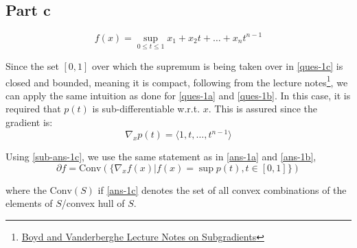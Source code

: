 \documentclass[11pt]{article}
\begin{document}
\subsection*{Part c}
\begin{flushleft}
\begin{equation}
\label{ques-1c}
\displaystyle f(x) = \sup_{0 \leq t \leq 1} x_{1} + x_{2}t + \ldots + x_{n}t^{n-1}
\end{equation}

Since the set \([0, 1]\) over which the supremum is being taken over in \ref{ques-1c} is closed and bounded, meaning it is compact, following from the lecture notes\footnote{\href{https://see.stanford.edu/materials/lsocoee364b/01-subgradients_notes.pdf}{Boyd and Vanderberghe Lecture Notes on Subgradients}}, we can apply the same intuition as done for \ref{ques-1a} and \ref{ques-1b}. In this case, it is required that \(p(t)\) is sub-differentiable w.r.t. \(x\). This is assured since the gradient is:
\begin{equation}
\label{sub-ans-1c}
\displaystyle \nabla_{x} p(t) =  \langle 1, t, \ldots, t^{n-1} \rangle
\end{equation}

Using \ref{sub-ans-1c}, we use the same statement as in \ref{ans-1a} and \ref{ans-1b},
\begin{equation}
\label{ans-1c}
\displaystyle \partial f = \text{Conv}\left(\{\nabla_{x} f(x) | f(x) = \sup p(t), t \in [0, 1]\}\right)
\end{equation}

where the \(\text{Conv}(S)\) if \ref{ans-1c} denotes the set of all convex combinations of the elements of \(S\)/convex hull of \(S\).
\end{flushleft}
\end{document}

